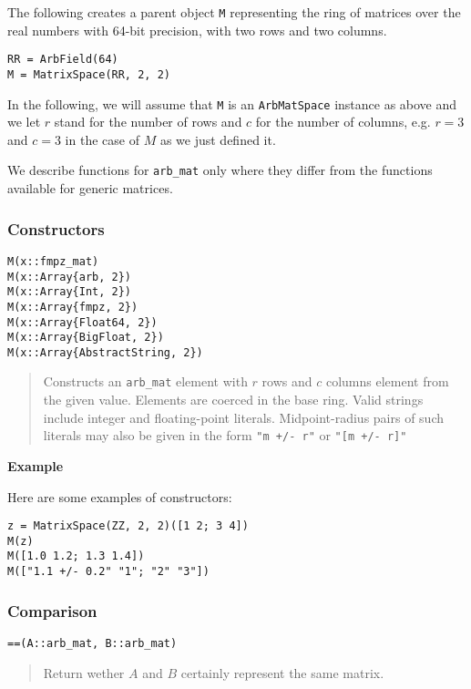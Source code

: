 \documentclass[a4paper,10pt]{article}
\newcommand{\code}{\lstinline}
\newcommand{\desc}[1]{\vspace{-3mm}\begin{quote}#1\end{quote}}
\begin{document}
{{The following creates a parent object \code{M} representing
the ring of matrices over the real numbers with 64-bit precision, with two rows
and two columns.

\begin{lstlisting}
RR = ArbField(64)
M = MatrixSpace(RR, 2, 2)
\end{lstlisting}

In the following, we will assume that \code{M} is an \code{ArbMatSpace}
instance as above and we let $r$ stand for the number of rows and $c$ for the
number of columns, e.g. $r = 3$ and $c = 3$ in the case of $M$ as we just defined it.

We describe functions for \code{arb_mat} only where they differ from the functions
available for generic matrices.

\subsubsection{Constructors}

\begin{lstlisting}
M(x::fmpz_mat)
M(x::Array{arb, 2})
M(x::Array{Int, 2})
M(x::Array{fmpz, 2})
M(x::Array{Float64, 2})
M(x::Array{BigFloat, 2})
M(x::Array{AbstractString, 2})
\end{lstlisting}

\desc{Constructs an \code{arb_mat} element with $r$ rows and $c$ columns element
from the given value. Elements are coerced in the base ring.
Valid strings include integer and floating-point literals. Midpoint-radius
pairs of such literals may also be given in the form \code{"m +/- r"}
or \code{"[m +/- r]"}}

\textbf{Example}

Here are some examples of constructors:

\begin{lstlisting}
z = MatrixSpace(ZZ, 2, 2)([1 2; 3 4])
M(z)
M([1.0 1.2; 1.3 1.4])
M(["1.1 +/- 0.2" "1"; "2" "3"])
\end{lstlisting}

\subsubsection{Comparison}

\begin{lstlisting}
==(A::arb_mat, B::arb_mat)
\end{lstlisting}

\desc{Return wether $A$ and $B$ certainly represent the same matrix.}

}}
\end{document}
